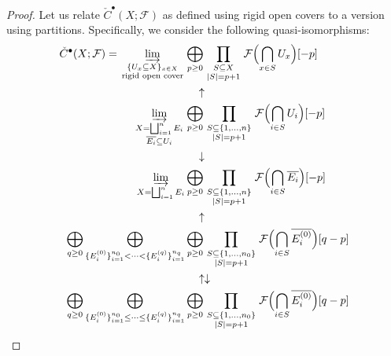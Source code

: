 \documentclass[12pt]{article}
\theoremstyle{definition}
\theoremstyle{remark}
\numberwithin{equation}{subsection}
\newcommand{\F}{\mathcal F}
\newcommand{\cC}{\check C}
\begin{document}
\begin{proof}
Let us relate $\cC^\bullet(X;\F)$ as defined using rigid open covers to a version using partitions.  Specifically, we consider the following quasi-isomorphisms:
\begin{align}
\cC^\bullet(X;\F)=\varinjlim_{\begin{smallmatrix}\{U_x\subseteq X\}_{x\in X}\cr\text{rigid open cover}\end{smallmatrix}}&\bigoplus_{p\geq 0}\prod_{\begin{smallmatrix}S\subseteq X\cr\left|S\right|=p+1\end{smallmatrix}}\F\Bigl(\bigcap_{x\in S}U_x\Bigr)[-p]\\
&\quad\uparrow\cr
\varinjlim_{\begin{smallmatrix}X=\bigsqcup_{i=1}^nE_i\cr\overline{E_i}\subseteq U_i\end{smallmatrix}}&\bigoplus_{p\geq 0}\prod_{\begin{smallmatrix}S\subseteq\{1,\ldots,n\}\cr\left|S\right|=p+1\end{smallmatrix}}\F\Bigl(\bigcap_{i\in S}U_i\Bigr)[-p]\\
&\quad\downarrow\cr
\label{cechbychogoshvili}\varinjlim_{X=\bigsqcup_{i=1}^nE_i}&\bigoplus_{p\geq 0}\prod_{\begin{smallmatrix}S\subseteq\{1,\ldots,n\}\cr\left|S\right|=p+1\end{smallmatrix}}\F\Bigl(\bigcap_{i\in S}\overline{E_i}\Bigr)[-p]\\
&\quad\uparrow\cr
\label{homotopycolimitofchogoshvili}\bigoplus_{q\geq 0}\bigoplus_{\{E_i^{(0)}\}_{i=1}^{n_0}<\cdots<\{E_i^{(q)}\}_{i=1}^{n_q}}&\bigoplus_{p\geq 0}\prod_{\begin{smallmatrix}S\subseteq\{1,\ldots,n_0\}\cr\left|S\right|=p+1\end{smallmatrix}}\F\Bigl(\bigcap_{i\in S}\overline{E_i^{(0)}}\Bigr)[q-p]\\
&\quad\uparrow\downarrow\cr
\label{almosthomotopycolimitofchogoshvilicoverstodualize}\bigoplus_{q\geq 0}\bigoplus_{\{E_i^{(0)}\}_{i=1}^{n_0}\leq\cdots\leq\{E_i^{(q)}\}_{i=1}^{n_q}}&\bigoplus_{p\geq 0}\prod_{\begin{smallmatrix}S\subseteq\{1,\ldots,n_0\}\cr\left|S\right|=p+1\end{smallmatrix}}\F\Bigl(\bigcap_{i\in S}\overline{E_i^{(0)}}\Bigr)[q-p]
\end{align}

\end{proof}
\end{document}
